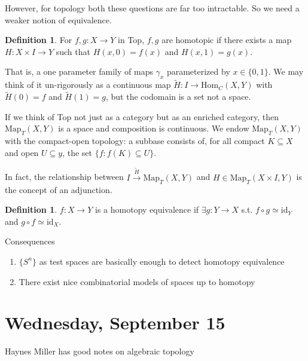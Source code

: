 \documentclass[12pt]{article}
\theoremstyle{definition}
\newtheorem{definition}[theorem]{Definition}
\begin{document}
	However, for topology both these questions are far too intractable. So we need a weaker notion of equivalence. 
	\begin{definition}
		For $f,g:X\to Y$ in Top, $f,g$ are homotopic if there exists a map $H:X\times I\to Y$ such that  $H(x,0)=f(x)$ and $H(x,1)=g(x)$.
	\end{definition}
	That is, a one parameter family of maps $\gamma_{x}$ parameterized by $x\in\{0,1\}$. We may think of it un-rigorously as a continuous map $\tilde{H}:I\to\text{Hom}_{C}(X,Y)$ with $\tilde{H}(0)=f$ and $\tilde{H}(1)=g$, but the codomain is a set not a space. 
	
	If we think of Top not just as a category but as an enriched category, then $\text{Map}_T(X,Y)$ is a space and composition is continuous. We endow $\text{Map}_T(X,Y)$ with the compact-open topology: a subbase consists of, for all compact $K\subseteq X$ and open $U\subseteq y$, the set $\{f:f(K)\subseteq U\}$.
	
	In fact, the relationship between $I\xrightarrow{\tilde{H}}\text{Map}_T(X,Y)$ and $H\in\text{Map}_T(X\times I,Y)$ is the concept of an adjunction.
	\begin{definition}
		$f:X\to Y$ is a homotopy equivalence if $\exists g: Y\to X$ s.t. $f\circ g\simeq \text{id}_{Y}$ and $g\circ f\simeq \text{id}_{X}$.
	\end{definition}
	Consequences 
	\begin{enumerate}
		\item $\{S^n\}$ as test spaces are basically enough to detect homotopy equivalence 
		\item There exist nice combinatorial models of spaces up to homotopy 
	\end{enumerate}
	
	\section{Wednesday, September 15}
	Haynes Miller has good notes on algebraic topology
	
\end{document}
